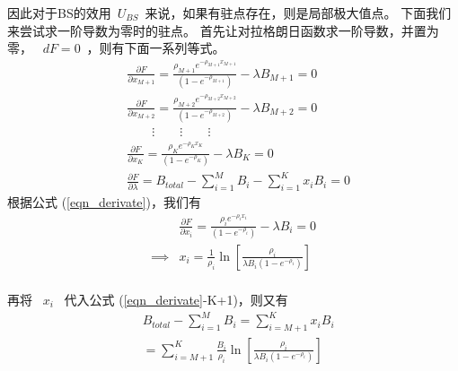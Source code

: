 因此对于BS的效用~$U_{BS}$~来说，如果有驻点存在，则是局部极大值点。
下面我们来尝试求一阶导数为零时的驻点。
首先让对拉格朗日函数求一阶导数，并置为零，
~$dF = 0$~，则有下面一系列等式。
\begin{subequations}
\label{eqn_derivate}
\begin{align} &\frac{\partial F}{\partial x_{M+1}} =
\frac{\rho_{M+1} e^{-\rho_{M+1} x_{M+1}}}{(1-e^{-\rho_{M+1}})} - \lambda B_{M+1} = 0 \tag{\theequation -M+1}\\
&\frac{\partial F}{\partial x_{M+2}} =
\frac{\rho_{M+2} e^{-\rho_{M+2} x_{M+2}}}{(1-e^{-\rho_{M+2}})} - \lambda B_{M+2} = 0 \tag{\theequation -M+2}\\
\nonumber & \qquad \vdots \qquad \vdots \qquad \vdots \\
&\frac{\partial F}{\partial x_K} =
\frac{\rho_K e^{-\rho_K x_K}}{(1-e^{-\rho_K})} - \lambda B_K = 0 \tag{\theequation -K}\\
&\frac{\partial F}{\partial \lambda} = B_{total} - \sum_{i=1}^M B_i -
\sum^K_{i=1}x_iB_i = 0 \tag{\theequation -K+1}
\end{align}
\end{subequations}
根据公式 (\ref{eqn_derivate})，我们有
\begin{equation*}
\begin{split}
&\frac{\partial F}{\partial x_i} = \frac{\rho_i e^{-\rho_i
x_i}}{(1-e^{-\rho_i})} - \lambda B_i = 0\\
\implies &x_i = \frac{1}{\rho_i} \ln \left[ \frac{\rho_i}{\lambda B_i(1-e^{-\rho_i})} \right] \\
\end{split}
\end{equation*}

再将 ~$x_i$~ 代入公式 (\ref{eqn_derivate}-K+1)，则又有
%
\begin{equation}
\begin{split}
&B_{total} -\sum_{i=1}^MB_i = \sum_{i=M+1}^K x_i B_i \\
&= \sum_{i=M+1}^K \frac{B_i}{\rho_i} \ln \left[ \frac{\rho_i}{\lambda B_i(1-e^{-\rho_i})} \right] \\
\end{split}
\label{eqn_find_mu}
\end{equation}

